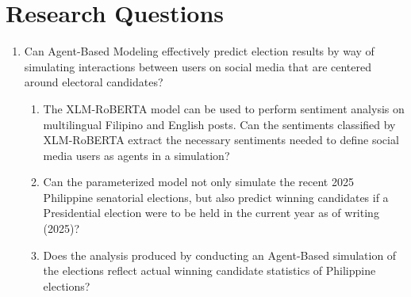 \section{Research Questions}

\begin{enumerate}
    \item Can Agent-Based Modeling effectively predict election results by way of simulating interactions between users on social media that are centered around electoral candidates?
    \begin{enumerate}
        \item The XLM-RoBERTA model can be used to perform sentiment analysis on multilingual Filipino and English posts. Can the sentiments classified by XLM-RoBERTA extract the necessary sentiments needed to define social media users as agents in a simulation?
        \item Can the parameterized model not only simulate the recent 2025 Philippine senatorial elections, but also predict winning candidates if a Presidential election were to be held in the current year as of writing (2025)?
        \item Does the analysis produced by conducting an Agent-Based simulation of the elections reflect actual winning candidate statistics of Philippine elections?
    \end{enumerate}
\end{enumerate}

% 
